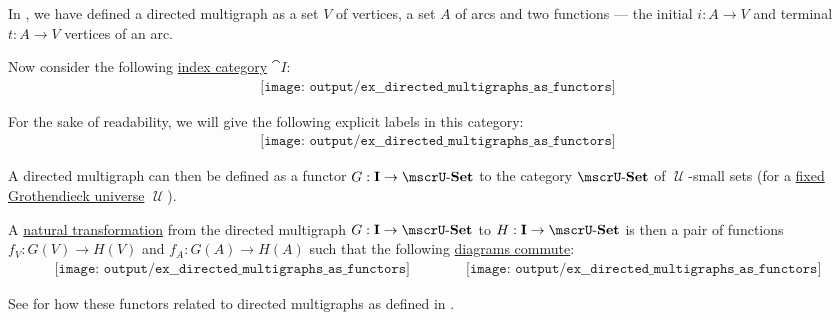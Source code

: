 \begin{example}\label{ex:directed_multigraphs_as_functors}
  In , we have defined a directed multigraph as a set \( V \) of vertices, a set \( A \) of arcs and two functions --- the initial \( i: A \to V \) and terminal \( t: A \to V \) vertices of an arc.

  Now consider the following \hyperref[def:categorical_diagram]{index category} \( \cat{I}: \)
  \begin{equation}\label{eq:ex:directed_multigraphs_as_functors/index/dots}
    \begin{aligned}
      \texttt{[image: output/ex\_\_directed\_multigraphs\_as\_functors]}
    \end{aligned}
  \end{equation}

  For the sake of readability, we will give the following explicit labels in this category:
  \begin{equation}\label{eq:ex:directed_multigraphs_as_functors/index/annotated}
    \begin{aligned}
      \texttt{[image: output/ex\_\_directed\_multigraphs\_as\_functors]}
    \end{aligned}
  \end{equation}

  A directed multigraph can then be defined as a functor \( G: \cat{I} \to \ucat{Set} \) to the category \hyperref[def:category_of_small_sets]{\( \ucat{Set} \)} of \( \mscrU \)-small sets (for a \hyperref[def:category_size]{fixed Grothendieck universe} \( \mscrU \)).

  A \hyperref[def:natural_transformation]{natural transformation} from the directed multigraph \( G: \cat{I} \to \ucat{Set} \) to \( H: \cat{I} \to \ucat{Set} \) is then a pair of functions \( f_V: G(V) \to H(V) \) and \( f_A: G(A) \to H(A) \) such that the following \hyperref[def:categorical_diagram]{diagrams commute}:
  \begin{equation}\label{eq:ex:directed_multigraphs_as_functors/index/diagram}
    \begin{aligned}
      \texttt{[image: output/ex\_\_directed\_multigraphs\_as\_functors]}
      \quad\quad\quad\quad
      \texttt{[image: output/ex\_\_directed\_multigraphs\_as\_functors]}
    \end{aligned}
  \end{equation}

  See  for how these functors related to directed multigraphs as defined in .
\end{example}

